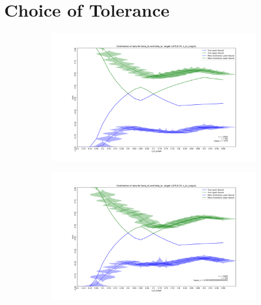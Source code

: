 \documentclass{article}
\begin{document}
\appendix
\renewcommand\thefigure{\thesection.\arabic{figure}} 

\setcounter{table}{0}
\renewcommand{\thetable}{A\arabic{table}}

\clearpage
\newpage

\section{Choice of Tolerance}

\begin{figure}[h!]
    \caption{Simulation Results by Choice of $\kappa_n$ \label{app_fig:tolerances}}
     \centering

     \begin{subfigure}[b]{0.49\textwidth}
         \centering
          \includegraphics[width=\textwidth]{graph/simulation_sharp_bounds_10000_500_0.01}
     \end{subfigure}
    \hfill
     \begin{subfigure}[b]{0.49\textwidth}
         \centering
          \includegraphics[width=\textwidth]{graph/simulation_sharp_bounds_10000_500_0.00030000000000000003.png}
        \end{subfigure}


\end{figure}
\end{document}
